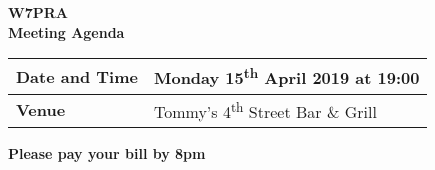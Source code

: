 \documentclass[letter,11pt]{extarticle}
\begin{document}
	\thispagestyle{empty}
	
	\begin{center}
		\textbf{W7PRA\\Meeting Agenda}
		\vspace{0.33cm}
	\end{center}
	
	\begin{center}
		\begin{tabular}{| m{3.0cm} | m{7.5cm} |} \hline
			\textbf{Date and Time} & Monday 15\textsuperscript{th} April 2019 at 19:00 \\ \hline
			\textbf{Venue} & Tommy's 4\textsuperscript{th} Street Bar \& Grill \\ \hline
				\end{tabular}
	\end{center}
	
	\begin{center}
		\textbf{Please pay your bill by 8pm}
	\end{center}
	
\end{document}
